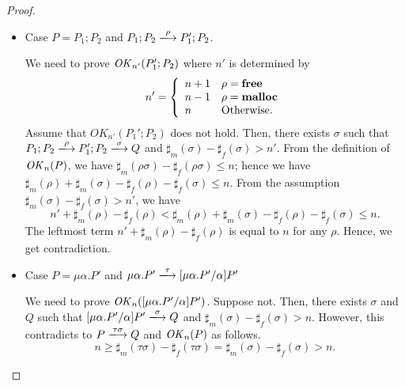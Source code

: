 \begin{proof}
\begin{itemize}
\item Case $P = P_{1};P_{2}$ and \(P_1;P_2 \xlongrightarrow{\rho} P_1';P_2\).

We need to prove \(\mathit{OK}_{n'}(P_1';P_2)\) where \(n'\) is determined by
\[
   n'=\left\{
   \begin{array}{ll}
     n + 1 & \rho = \mathbf{free}\\
     n - 1 & \rho = \mathbf{malloc}\\
     n & \mbox{Otherwise.}
   \end{array}
   \right.
\]
Assume that \(OK_{n'}(P_{1}';P_{2})\) does not hold. Then, there
exists \(\sigma\) such that \(P_{1};P_{2} \xlongrightarrow{\rho}
P_{1}';P_{2} \xlongrightarrow{\sigma} Q\) and \(\sharp_{m}(\sigma) -
\sharp_{f}(\sigma) > n'\).  From the definition of \(\mathit{OK}_n(P)\), we
have \( \sharp_{m}(\rho\sigma) - \sharp_{f}(\rho\sigma) \le n\); hence
we have \(\sharp_{m}(\rho) + \sharp_{m}(\sigma) - \sharp_{f}(\rho)
-\sharp_{f}(\sigma) \le n\).  From the assumption \(\sharp_{m}(\sigma)
- \sharp_{f}(\sigma) > n'\), we have
\[
n' + \sharp_m(\rho) - \sharp_f(\rho) < \sharp_{m}(\rho) +
\sharp_{m}(\sigma) - \sharp_{f}(\rho) -\sharp_{f}(\sigma) \le n.
\]
The leftmost term \(n' + \sharp_m(\rho) - \sharp_f(\rho)\) is equal to
\(n\) for any \(\rho\).  Hence, we get contradiction.

\item Case \(P = \mu\alpha.P'\) and \(\mu\alpha.P'  \xlongrightarrow{\tau} [\mu\alpha.P'\slash\alpha]P'\)

We need to prove \(\mathit{OK}_n([\mu\alpha.P' / \alpha]P')\).  Suppose not.
Then, there exists \(\sigma\) and \(Q\) such that \([\mu\alpha.P' /
  \alpha]P' \xlongrightarrow{\sigma} Q\) and \(\sharp_m(\sigma) -
\sharp_f(\sigma) > n\).  However, this contradicts to \(P
\xlongrightarrow{\tau\sigma} Q\) and \(\mathit{OK}_n(P)\) as follows.
\[
n \ge \sharp_m(\tau\sigma) - \sharp_f(\tau\sigma) = \sharp_m(\sigma) -
\sharp_f(\sigma) > n.
\]

\end{itemize}
\end{proof}

